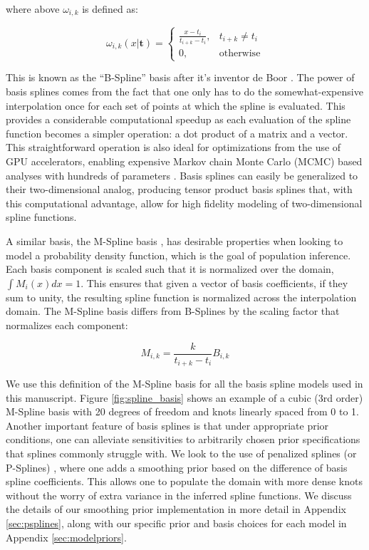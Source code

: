 \noindent where above $\omega_{i,k}$ is defined as:

\begin{equation}
\omega_{i,k}(x | \mathbf{t}) =
\begin{cases}
    \frac{x-t_i}{t_{i+k}-t_i}, & t_{i+k} \neq t_i \\
    0, & \text{otherwise}
\end{cases}
\end{equation}

\noindent This is known as the ``B-Spline'' basis after it's inventor de Boor \citep{deBoor78}. The power of basis splines
comes from the fact that one only has to do the somewhat-expensive interpolation once for each set of points at which the spline is evaluated. 
This provides a considerable computational speedup as each evaluation of the spline function becomes a simpler operation: a dot product of a 
matrix and a vector. This straightforward operation is also ideal for optimizations from the use of GPU accelerators, 
enabling expensive Markov chain Monte Carlo (MCMC) based analyses with hundreds of parameters . 
Basis splines can easily be generalized to their two-dimensional analog, producing tensor product basis splines that, 
with this computational advantage, allow for high fidelity modeling of two-dimensional spline functions.

A similar basis, the M-Spline basis \citep{monotone_regression_splines}, has desirable properties when looking to model a probability density function, 
which is the goal of population inference. Each basis component is scaled such that it is normalized over the domain, $\int M_i(x)dx = 1$. This ensures 
that given a vector of basis coefficients, if they sum to unity, the resulting spline function is normalized across the interpolation domain. 
The M-Spline basis differs from B-Splines by the scaling factor that normalizes each component:

\begin{equation}\label{eq:MB_SplineRelation}
M_{i,k} = \frac{k}{t_{i+k} - t_i} B_{i,k}
\end{equation}

\noindent We use this definition of the M-Spline basis for all the basis spline models used in this manuscript. Figure \ref{fig:spline_basis} 
shows an example of a cubic (3rd order) M-Spline basis with 20 degrees of freedom and knots linearly spaced from 0 to 1.
Another important feature of basis splines is that under appropriate prior conditions, one can alleviate sensitivities to arbitrarily 
chosen prior specifications that splines commonly struggle with. We look to the use of penalized splines (or P-Splines) \citep{eilers2021practical,BayesianPSplines,Jullion2007RobustSO}, 
where one adds a smoothing prior based on the difference of basis spline coefficients. This allows one to populate the domain with more dense knots 
without the worry of extra variance in the inferred spline functions. We discuss the details of our smoothing prior implementation 
in more detail in Appendix \ref{sec:psplines}, along with our specific prior and basis choices for each model in Appendix \ref{sec:modelpriors}.
